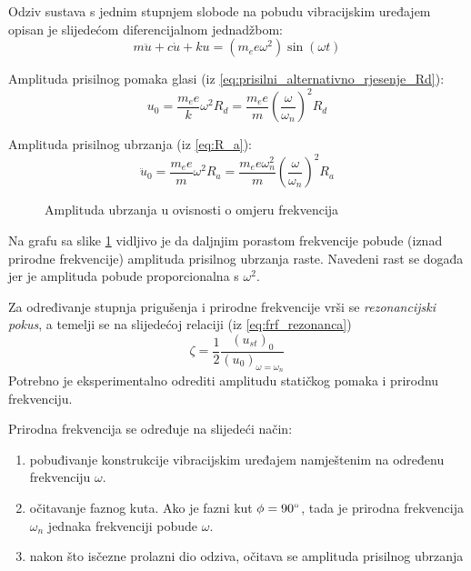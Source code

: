 Odziv sustava s jednim stupnjem slobode na pobudu vibracijskim uređajem opisan je
slijedećom diferencijalnom jednadžbom:
\begin{equation}
    m\ddot{u}+c\dot{u}+ku=(m_ee\omega^2)\sin(\omega t)
\end{equation}

Amplituda prisilnog pomaka glasi (iz \eqref{eq:prisilni_alternativno_rjesenje_Rd}):
\begin{equation}
    u_0=\frac{m_ee}{k}\omega^2R_d = \frac{m_ee}{m}\left(\frac{\omega}{\omega_n}\right)^2R_d
\end{equation}

Amplituda prisilnog ubrzanja (iz \eqref{eq:R_a}):
\begin{equation}
    \ddot{u}_0=\frac{m_ee}{m}\omega^2R_a=\frac{m_ee\omega_n^2}{m}\left(\frac{\omega}{\omega_n}\right)^2R_a
\end{equation}

\begin{figure}[H]
    
    \caption{Amplituda ubrzanja u ovisnosti o omjeru frekvencija}
    \label{fig:ra-vibracijski}
\end{figure}

Na grafu sa slike \ref{fig:ra-vibracijski} vidljivo je da daljnjim porastom frekvencije pobude (iznad prirodne
frekvencije) amplituda prisilnog ubrzanja raste. Navedeni rast se događa jer je
amplituda pobude proporcionalna s $\omega^2$. 
\par

Za određivanje stupnja prigušenja i prirodne frekvencije vrši se
\textit{rezonancijski pokus}, a temelji se na slijedećoj relaciji (iz \eqref{eq:frf_rezonanca})
\begin{equation}\label{eq:rezonancijski_pokus}
    \zeta = \frac{1}{2}\frac{(u_{st})_0}{(u_0)_{\omega=\omega_n}}
\end{equation}
Potrebno je eksperimentalno odrediti amplitudu statičkog pomaka i prirodnu frekvenciju. 

Prirodna frekvencija se određuje na slijedeći način:
\begin{enumerate}
    \item pobuđivanje konstrukcije vibracijskim uređajem namještenim na
        određenu frekvenciju $\omega$.
    \item očitavanje faznog kuta. Ako je fazni kut $\phi = 90\degree$, tada je
        prirodna frekvencija $\omega_n$ jednaka frekvenciji pobude $\omega$.
    \item nakon što isčezne prolazni dio odziva, očitava se amplituda prisilnog ubrzanja
\end{enumerate}

